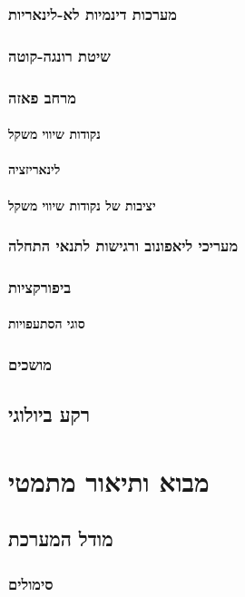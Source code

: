 \documentclass{report}
\begin{document}
\section{מערכות דינמיות לא-לינאריות}
\section{שיטת רונגה-קוטה}
\section{מרחב פאזה}
\subsection{נקודות שיווי משקל}
\subsection{לינאריזציה}
\subsection{יציבות של נקודות שיווי משקל}
\section{מעריכי ליאפונוב ורגישות לתנאי התחלה}
\section{ביפורקציות}
\subsection{סוגי הסתעפויות}
\section{מושכים}
\chapter{רקע ביולוגי}

\part{מבוא ותיאור מתמטי}
\chapter{מודל המערכת}
\section{סימולים}
\end{document}

